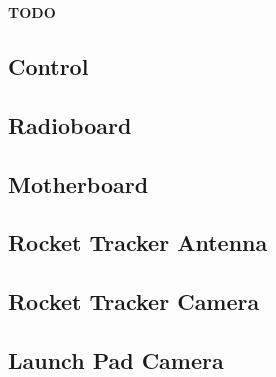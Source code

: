 \textbf{TODO}

\subsection{Control}


\subsection{Radioboard}


\subsection{Motherboard}


\subsection{Rocket Tracker Antenna}


\subsection{Rocket Tracker Camera}


\subsection{Launch Pad Camera}

